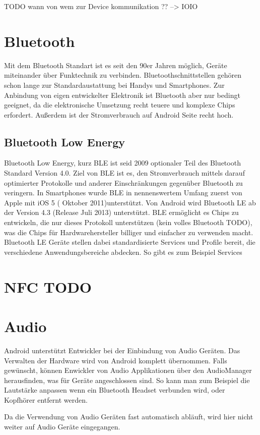 \documentclass[12pt,journal,compsoc]{IEEEtran}
\begin{document}
TODO wann von wem zur Device kommunikation ?? --> IOIO

\section{Bluetooth}
Mit dem Bluetooth Standart ist es seit den 90er Jahren möglich, Geräte miteinander über Funktechnik zu verbinden. Bluetoothschnittstellen gehören schon lange zur Standardaustattung bei Handys und Smartphones. Zur Anbindung von eigen entwickelter Elektronik ist Bluetooth aber nur bedingt geeignet, da die elektronische Umsetzung recht teuere und komplexe Chips erfordert. Außerdem ist der Stromverbrauch auf Android Seite recht hoch.
\subsection{Bluetooth Low Energy}
Bluetooth Low Energy, kurz BLE ist seid 2009 optionaler Teil des Bluetooth Standard Version 4.0. 
Ziel von BLE ist es, den Stromverbrauch mittels darauf optimierter Protokolle und anderer Einschränkungen gegenüber Bluetooth zu veringern.
In Smartphones wurde BLE in nennenswertem Umfang zuerst von Apple mit iOS 5 ( Oktober 2011)unterstützt.
Von Android wird Bluetooth LE ab der Version 4.3 (Release Juli 2013) unterstützt.
BLE ermöglicht es Chips zu entwickeln, die nur dieses Protokoll unterstützen (kein volles Bluetooth TODO), was die Chips für Hardwarehersteller billiger und einfacher zu verwenden macht.
Bluetooth LE Geräte stellen dabei standardisierte Services und Profile bereit, die verschiedene Anwendungsbereiche abdecken.
So gibt es zum Beispiel Services  
\cite{bluetooth}

\section{NFC TODO}


\section{Audio}
Android unterstützt Entwickler bei der Einbindung von Audio Geräten. Das Verwalten der Hardware wird von Android komplett übernommen.
Falls gewünscht, können Enwickler von Audio Applikationen über den AudioManager herausfinden, was für Geräte angeschlossen sind. So kann man zum Beispiel die Lautstärke anpassen wenn ein Bluetooth Headset verbunden wird, oder Kopfhörer entfernt werden.

Da die Verwendung von Audio Geräten fast automatisch abläuft, wird hier nicht weiter auf Audio Geräte eingegangen.
\end{document}
